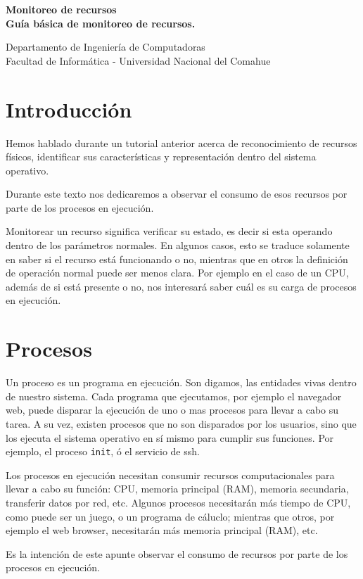 \documentclass[12pt]{article}
\def\maketitle{

 \makeatletter
 {\color{bl} \centering \huge \sc \textbf{
 Monitoreo de recursos \\ 
\large \vspace*{-8pt} \color{black} Guía básica de monitoreo de recursos. 
 \vspace*{8pt} }\par}
 \makeatother


 \makeatletter
 {\centering \small 
 	Departamento de Ingeniería de Computadoras \\
 	Facultad de Informática - Universidad Nacional del Comahue \\
 	\vspace{20pt} }
 \makeatother

}
\begin{document}
\thispagestyle{empty}
\maketitle
\setlength{\parindent}{0pt}

\section*{Introducción}

Hemos hablado durante un tutorial anterior acerca de reconocimiento de recursos 
físicos, identificar sus características y representación dentro del 
sistema operativo.

Durante este texto nos dedicaremos a observar el consumo de esos recursos 
por parte de los procesos en ejecución. 

Monitorear un recurso significa verificar su estado, es decir si esta 
operando dentro de los parámetros normales. En algunos casos, esto se 
traduce solamente en saber si el recurso está funcionando o no, mientras 
que en otros la definición de operación normal puede ser menos clara. 
Por ejemplo en el caso de un CPU, además de si está presente o no, nos 
interesará saber cuál es su carga de procesos en ejecución. 


\section*{Procesos}

Un proceso es un programa en ejecución. Son digamos, las entidades vivas dentro 
de nuestro sistema. Cada programa que ejecutamos, por ejemplo el navegador web,
 puede disparar la ejecución de uno o mas procesos para llevar a cabo su tarea. A su vez, existen procesos que no son disparados por los usuarios, sino que 
los ejecuta el sistema operativo en sí mismo para cumplir sus funciones. Por 
ejemplo, el proceso \texttt{init}, ó el servicio de ssh. 

Los procesos en ejecución necesitan consumir recursos computacionales para 
llevar a cabo su función: CPU, memoria principal (RAM), memoria secundaria, 
transferir datos por red, etc. Algunos procesos necesitarán más tiempo de CPU, 
como puede ser un juego, o un programa de cáluclo; mientras que otros, por 
ejemplo el web browser, necesitarán más memoria principal (RAM), etc.

Es la intención de este apunte observar el consumo de recursos por parte de 
los procesos en ejecución. 
 
\end{document}
